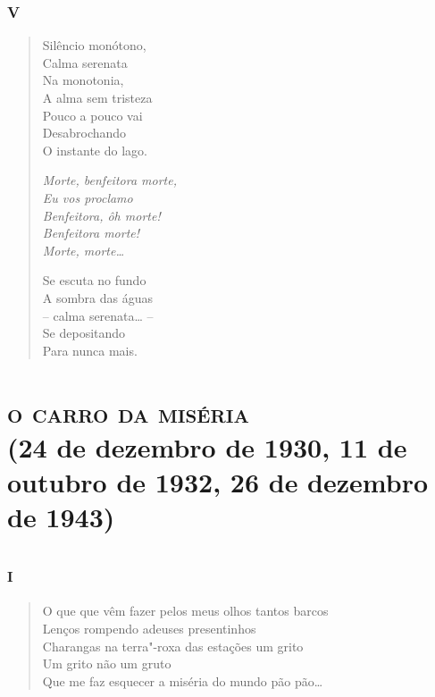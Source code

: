 {\pagebreak
\section*{V}

\begin{verse}
Silêncio monótono,\\
Calma serenata\\
Na monotonia,\\
A alma sem tristeza\\
Pouco a pouco vai\\
Desabrochando\\
O instante do lago.

\qquad\emph{Morte, benfeitora morte,}\\
\qquad\emph{Eu vos proclamo }\\
\qquad\emph{Benfeitora, ôh morte! }\\
\qquad\emph{Benfeitora morte! }\\
\qquad\emph{Morte, morte\ldots{}}

Se escuta no fundo\\
A sombra das águas\\
-- calma serenata\ldots{} --\\
Se depositando\\
Para nunca mais.
\end{verse}

\movetooddpage
{}
\part[o carro da miséria]{\textsc{o carro da miséria}\\{\large (24 de dezembro de 1930, 11 de outubro de 1932, 26 de dezembro de 1943)}}
\removeepigraph

\chapter[«O que que vêm fazer pelos meus olhos tantos barcos»]{\textsc{i}}

\begin{verse}
O que que vêm fazer pelos meus olhos tantos barcos\\
Lenços rompendo adeuses presentinhos\\
Charangas na terra"-roxa das estações um grito\\
Um grito não um gruto\\
Que me faz esquecer a miséria do mundo pão pão\ldots{}


\end{verse}}
